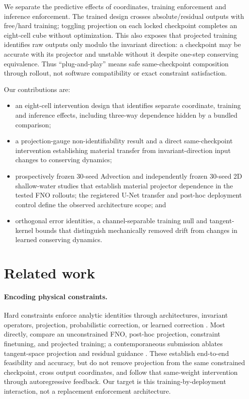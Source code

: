 \documentclass{article}
\begin{document}
We separate the predictive effects of coordinates, training enforcement and inference enforcement. The trained design
crosses absolute/residual outputs with free/hard training; toggling projection on each locked
checkpoint completes an eight-cell cube without optimization. This also exposes that projected
training identifies raw outputs only modulo the invariant direction: a checkpoint may be accurate
with its projector and unstable without it despite one-step conserving equivalence. Thus
``plug-and-play'' means safe same-checkpoint composition through rollout, not software
compatibility or exact constraint satisfaction.

Our contributions are:
\begin{itemize}
  \item an eight-cell intervention design that identifies separate coordinate, training and
  inference effects, including three-way dependence hidden by a bundled comparison;
  \item a projection-gauge non-identifiability result and a direct same-checkpoint intervention
  establishing material transfer from invariant-direction input changes to conserving dynamics;
  \item prospectively frozen 30-seed Advection and independently frozen 30-seed 2D shallow-water
  studies that establish material projector dependence in the tested FNO rollouts; the registered
  U-Net transfer and post-hoc deployment control define the observed architecture scope; and
  \item orthogonal error identities, a channel-separable training null and tangent-kernel bounds
  that distinguish mechanically removed drift from changes in learned conserving dynamics.
\end{itemize}

\section{Related work}

\paragraph{Encoding physical constraints.}
Hard constraints enforce analytic identities through architectures, invariant operators,
projection, probabilistic correction, or learned correction
\citep{beucler2021,richterpowell2022,liu2023ino,liu2024clawno,hansen2023,mouli2024,
zhang2023concernet,harder2023,tanaka2025,liu2025adaptive}. Most directly,
\citet{duruisseaux2024} compare an unconstrained FNO, post-hoc projection, constraint finetuning,
and projected training; a contemporaneous submission ablates tangent-space projection and residual
guidance \citep{anonymous2026pmfm}. These establish end-to-end feasibility and accuracy, but do not
remove projection from the same constrained checkpoint, cross output coordinates, and follow that
same-weight intervention through autoregressive feedback. Our target is this
training-by-deployment interaction, not a replacement enforcement architecture.
\end{document}
